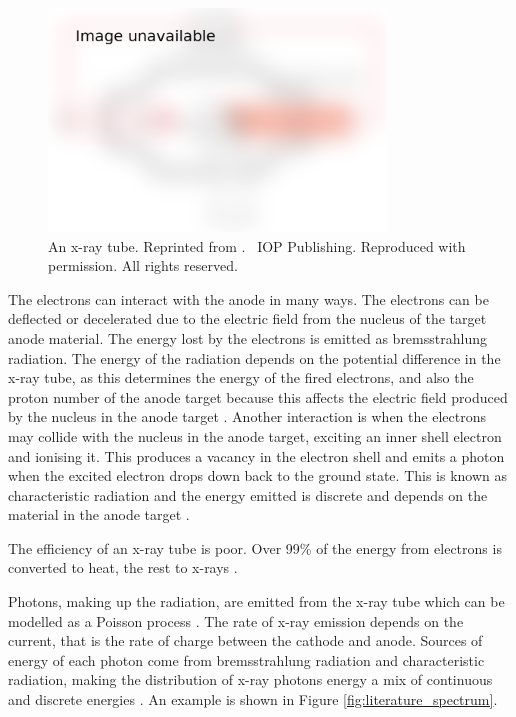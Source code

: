 \begin{figure}
  \centering
  \includegraphics[width=0.8\textwidth]{../figures/literatureReview/literature_tube.png}
  \caption{An x-ray tube. Reprinted from \cite{michael2001x}. \textcopyright\ IOP Publishing. Reproduced with permission. All rights reserved.}
  \label{fig:literature_tube}
\end{figure}

The electrons can interact with the anode in many ways. The electrons can be deflected or decelerated due to the electric field from the nucleus of the target anode material. The energy lost by the electrons is emitted as bremsstrahlung radiation. The energy of the radiation depends on the potential difference in the x-ray tube, as this determines the energy of the fired electrons, and also the proton number of the anode target because this affects the electric field produced by the nucleus in the anode target \citep{sun2012overview}. Another interaction is when the electrons may collide with the nucleus in the anode target, exciting an inner shell electron and ionising it. This produces a vacancy in the electron shell and emits a photon when the excited electron drops down back to the ground state. This is known as characteristic radiation and the energy emitted is discrete and depends on the material in the anode target \citep{sun2012overview}.

The efficiency of an x-ray tube is poor. Over 99\% of the energy from electrons is converted to heat, the rest to x-rays \citep{kruth2011computed}.

Photons, making up the radiation, are emitted from the x-ray tube which can be modelled as a Poisson process \citep{whiting2006properties, cierniak2011x}. The rate of x-ray emission depends on the current, that is the rate of charge between the cathode and anode. Sources of energy of each photon come from bremsstrahlung radiation and characteristic radiation, making the distribution of x-ray photons energy a mix of continuous and discrete energies \citep{sun2012overview}. An example is shown in Figure \ref{fig:literature_spectrum}.

